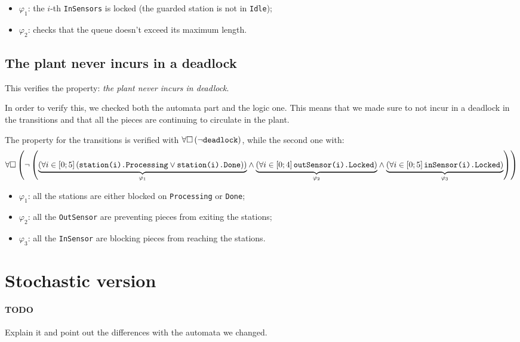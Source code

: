 \documentclass[a4paper]{article}
\newcommand{\formulacomment}[2]{\underset{\varphi_{#1}}{\underbrace{#2}}}
\newcommand{\formulatext}[1]{\text{\texttt{#1}}}
\begin{document}
    \begin{itemize}
        \item \(\varphi_1\): the \(i\)-th \texttt{InSensors} is locked (the guarded station is not in \texttt{Idle});
        \item \(\varphi_2\): checks that the queue doesn't exceed its maximum length.
    \end{itemize}

    \subsection{The plant never incurs in a deadlock}

    This verifies the property: \textit{the plant never incurs in deadlock}.\medskip

    In order to verify this, we checked both the automata part and the logic one. This means that we made sure to not incur in a deadlock in the transitions and that all the pieces are continuing to circulate in the plant.\medskip

    The property for the transitions is verified with \(\forall \square \left(\neg \formulatext{deadlock}\right)\), while the second one with:
    {
        \scriptsize
        \[\forall \square \left(\neg \left(\formulacomment{1}{\left(\forall i \in \left[0; 5\right] \left(\formulatext{station(i).Processing} \vee \formulatext{station(i).Done}\right)\right)} \wedge \formulacomment{2}{\left(\forall i \in \left[0; 4\right] \formulatext{outSensor(i).Locked}\right)} \wedge \formulacomment{3}{\left(\forall i \in \left[0; 5\right] \formulatext{inSensor(i).Locked}\right)}\right)\right)\]
    }

    \begin{itemize}
        \item \(\varphi_1\): all the stations are either blocked on \texttt{Processing} or \texttt{Done};
        \item \(\varphi_2\): all the \texttt{OutSensor} are preventing pieces from exiting the stations;
        \item \(\varphi_3\): all the \texttt{InSensor} are blocking pieces from reaching the stations.
    \end{itemize}

    \section{Stochastic version}

    \paragraph{TODO} Explain it and point out the differences with the automata we changed.
\end{document}
